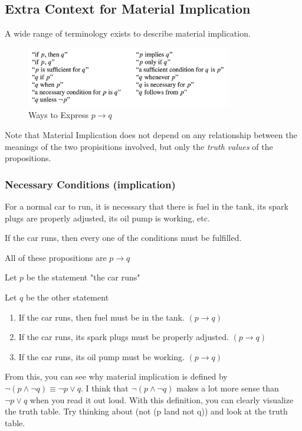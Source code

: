 \documentclass[12pt]{article}
\begin{document}
\subsection{Extra Context for Material Implication}

A wide range of terminology exists to describe material implication.

\begin{figure}[H]
    \centering
    \includegraphics[width=0.8\textwidth]{"./p_implies_q.png"}
    \caption{Ways to Express $p \to q$}
    \label{fig:p_implies_q}
\end{figure}

Note that Material Implication does not depend on any relationship between the
meanings of the two propisitions involved, but only the \textit{truth values} of
the propositions.

\subsubsection{Necessary Conditions (implication)}

For a normal car to run, it is necessary that there is fuel in the tank,
its spark plugs are properly adjusted, its oil pump is working, etc.

If the car runs, then every one of the conditions must be fulfilled.

All of these propositions are $p \to q$

Let $p$ be the statement "the car runs"

Let $q$ be the other statement

\begin{enumerate}
\item If the car runs, then fuel must be in the tank. $(p \to q)$
\item If the car runs, its spark plugs must be properly adjusted. $(p \to q)$
\item If the car runs, its oil pump must be working. $(p \to q)$
\end{enumerate}

From this, you can see why material implication is defined by 
$\neg (p \land \neg q) \equiv \neg p \lor q$. I think that $\neg (p \land \neg q)$
makes a lot more sense than $\neg p \lor q$ when you read it out loud. With
this definition, you can clearly visualize the truth table. Try thinking about
(not (p land not q)) and look at the truth table.
\end{document}
